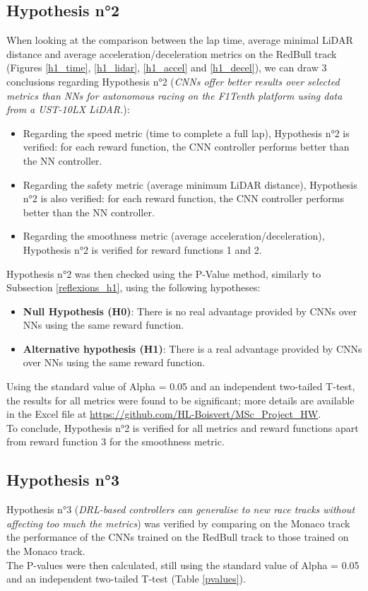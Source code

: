 \subsection{Hypothesis n°2}
When looking at the comparison between the lap time, average minimal LiDAR distance and average acceleration/deceleration metrics on the RedBull track (Figures \ref{h1_time}, \ref{h1_lidar}, \ref{h1_accel} and \ref{h1_decel}), we can draw 3 conclusions regarding Hypothesis n°2 (\textit{CNNs offer better results over selected metrics than NNs for autonomous racing on the F1Tenth platform using data from a UST-10LX LiDAR.}):
\begin{itemize}
	\item Regarding the speed metric (time to complete a full lap), Hypothesis n°2 is verified: for each reward function, the CNN controller performs better than the NN controller.
	\item Regarding the safety metric (average minimum LiDAR distance), Hypothesis n°2 is also verified: for each reward function, the CNN controller performs better than the NN controller.
	\item Regarding the smoothness metric (average acceleration/deceleration), Hypothesis n°2 is verified for reward functions 1 and 2.
\end{itemize}

Hypothesis n°2 was then checked using the P-Value method, similarly to Subsection \ref{reflexions_h1}, using the following hypotheses:

\begin{itemize}
	\item \textbf{Null Hypothesis (H0)}: There is no real advantage provided by CNNs over NNs using the same reward function.
	\item \textbf{Alternative hypothesis (H1)}: There is a real advantage provided by CNNs over NNs using the same reward function.
\end{itemize}

Using the standard value of Alpha = 0.05 and an independent two-tailed T-test, the results for all metrics were found to be significant; more details are available in the Excel file at \url{https://github.com/HL-Boisvert/MSc_Project_HW}. \\
To conclude, Hypothesis n°2 is verified for all metrics and reward functions apart from reward function 3 for the smoothness metric.

\subsection{Hypothesis n°3}
Hypothesis n°3 (\textit{DRL-based controllers can generalise to new race tracks without affecting too much the metrics}) was verified by comparing on the Monaco track the performance of the CNNs trained on the RedBull track to those trained on the Monaco track. \\
The P-values were then calculated, still using the standard value of Alpha = 0.05 and an independent two-tailed T-test (Table \ref{pvalues}).

